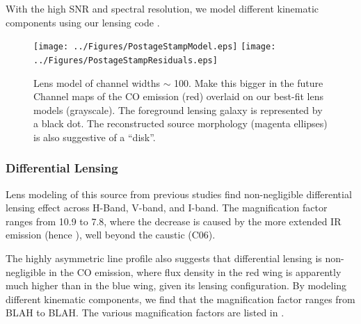 \documentclass[]{emulateapj}
\begin{document}
With the high SNR and spectral resolution, we model different kinematic components using our lensing code \uvmcmcfit.





\begin{figure}[tbph]
\centering
\texttt{[image: ../Figures/PostageStampModel.eps]}
\texttt{[image: ../Figures/PostageStampResiduals.eps]}
\caption{
Lens model of channel widths $\sim$ 100\kms.
Make this bigger in the future
Channel maps of the CO emission (red) overlaid on our best-fit lens models (grayscale). The foreground lensing galaxy is represented by a black dot. The reconstructed source morphology (magenta ellipses) is also suggestive of a “disk”.
\label{fig:model}}
\end{figure}



\subsubsection{Differential Lensing} \label{sec:differential}
Lens modeling of this source from previous studies find non-negligible differential lensing effect across H-Band, V-band, and I-band. The magnification factor ranges from 10.9
to 7.8, where the decrease is caused
by the more extended IR emission (hence \SF), well beyond the caustic (C06).

The highly asymmetric \bco line profile also suggests that differential lensing is non-negligible in the CO emission, where
flux density in the red wing is apparently much higher than in the blue wing, given its lensing configuration.
By modeling different kinematic components, we find that the magnification factor ranges from BLAH to BLAH. The various magnification factors are listed in .

\end{document}
